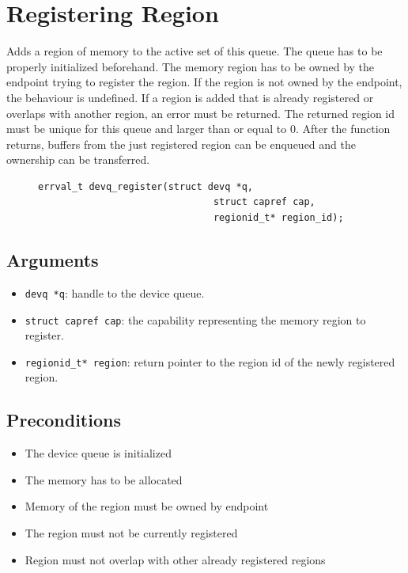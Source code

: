 \documentclass[a4paper,11pt,twoside]{report}
\begin{document}
	\section{Registering Region}
	Adds a region of memory to the active set of this queue. 
	The queue has to be properly initialized beforehand. 
	The memory region has to be owned by the endpoint trying to register the region. 
	If the region is not owned by the endpoint, the behaviour is undefined.
	If a region is added that is already registered or overlaps with another region, an error must be returned. 
	The returned region id must be unique for this queue and larger than or equal to 0. After the function returns, 
	buffers from the just registered region can be enqueued and the ownership
	can be transferred. 
	\begin{figure}[h]
		\begin{lstlisting}[style=code]
        errval_t devq_register(struct devq *q,
                               struct capref cap,
                               regionid_t* region_id);
		\end{lstlisting}
		\label{lst:register}
	\end{figure}
	
	\subsection*{Arguments}
	\begin{itemize}
		\item \texttt{devq *q}: handle to the device queue.
		\item \texttt{struct capref cap}: the capability representing the memory region to register.
		\item \texttt{regionid\_t* region}: return pointer to the region id of the newly registered region.
	\end{itemize}
	\subsection*{Preconditions}
	\begin{itemize}
		\item The device queue is initialized
		\item The memory has to be allocated
		\item Memory of the region must be owned by endpoint 
		\item The region must not be currently registered
		\item Region must not overlap with other already registered regions 
	\end{itemize}
\end{document}
